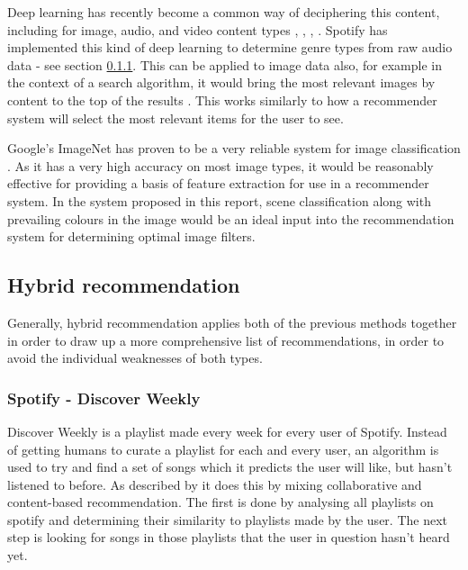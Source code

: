 \documentclass[a4paper,12pt]{report}
\begin{document}
        Deep learning has recently become a common way of deciphering this content, including for image, audio, and video content types \citep{coates2011analysis}, \citep{ciregan2012multi}, \citep{lee2009unsupervised}, \citep{mobahi2009deep}.
        Spotify has implemented this kind of deep learning to determine genre types from raw audio data - see section \ref{discoverweekly}.
        This can be applied to image data also, for example in the context of a search algorithm, it would bring the most relevant images by content to the top of the results \citep{yee2003faceted}. This works similarly to how a recommender system will select the most relevant items for the user to see.

        Google's ImageNet has proven to be a very reliable system for image classification \citep{krizhevsky2012imagenet}.
        As it has a very high accuracy on most image types, it would be reasonably effective for providing a basis of feature extraction for use in a recommender system. In the system proposed in this report, scene classification along with prevailing colours in the image would be an ideal input into the recommendation system for determining optimal image filters.


    \subsection{Hybrid recommendation}
      Generally, hybrid recommendation applies both of the previous methods together in order to draw up a more comprehensive list of recommendations, in order to avoid the individual weaknesses of both types.

      \subsubsection{Spotify - Discover Weekly}
      \label{discoverweekly}
        Discover Weekly is a playlist made every week for every user of Spotify. Instead of getting humans to curate a playlist for each and every user, an algorithm is used to try and find a set of songs which it predicts the user will like, but hasn't listened to before. As described by \cite{popper2015dw} it does this by mixing collaborative and content-based recommendation. The first is done by analysing all playlists on spotify and determining their similarity to playlists made by the user. The next step is looking for songs in those playlists that the user in question hasn't heard yet.
\end{document}
